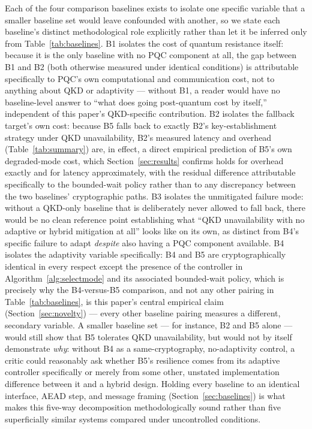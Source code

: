 \documentclass[journal]{IEEEtran}
\begin{document}
Each of the four comparison baselines exists to isolate one specific variable that a smaller baseline set would leave confounded with another, so we state each baseline's distinct methodological role explicitly rather than let it be inferred only from Table~\ref{tab:baselines}. B1 isolates the cost of quantum resistance itself: because it is the only baseline with no PQC component at all, the gap between B1 and B2 (both otherwise measured under identical conditions) is attributable specifically to PQC's own computational and communication cost, not to anything about QKD or adaptivity --- without B1, a reader would have no baseline-level answer to ``what does going post-quantum cost by itself,'' independent of this paper's QKD-specific contribution. B2 isolates the fallback target's own cost: because B5 falls back to exactly B2's key-establishment strategy under QKD unavailability, B2's measured latency and overhead (Table~\ref{tab:summary}) are, in effect, a direct empirical prediction of B5's own degraded-mode cost, which Section~\ref{sec:results} confirms holds for overhead exactly and for latency approximately, with the residual difference attributable specifically to the bounded-wait policy rather than to any discrepancy between the two baselines' cryptographic paths. B3 isolates the unmitigated failure mode: without a QKD-only baseline that is deliberately never allowed to fall back, there would be no clean reference point establishing what ``QKD unavailability with no adaptive or hybrid mitigation at all'' looks like on its own, as distinct from B4's specific failure to adapt \emph{despite} also having a PQC component available. B4 isolates the adaptivity variable specifically: B4 and B5 are cryptographically identical in every respect except the presence of the controller in Algorithm~\ref{alg:selectmode} and its associated bounded-wait policy, which is precisely why the B4-versus-B5 comparison, and not any other pairing in Table~\ref{tab:baselines}, is this paper's central empirical claim (Section~\ref{sec:novelty}) --- every other baseline pairing measures a different, secondary variable. A smaller baseline set --- for instance, B2 and B5 alone --- would still show that B5 tolerates QKD unavailability, but would not by itself demonstrate \emph{why}: without B4 as a same-cryptography, no-adaptivity control, a critic could reasonably ask whether B5's resilience comes from its adaptive controller specifically or merely from some other, unstated implementation difference between it and a hybrid design. Holding every baseline to an identical interface, AEAD step, and message framing (Section~\ref{sec:baselines}) is what makes this five-way decomposition methodologically sound rather than five superficially similar systems compared under uncontrolled conditions.
\end{document}
